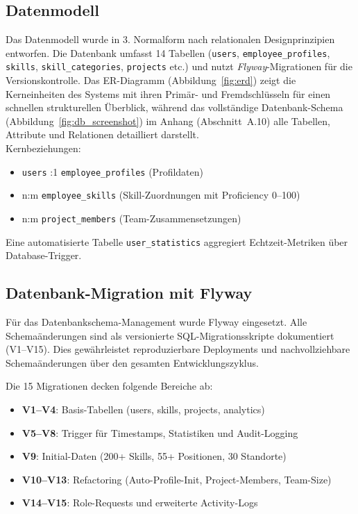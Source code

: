 \subsection{Datenmodell}

Das Datenmodell wurde in 3. Normalform nach relationalen Designprinzipien 
entworfen\cite{database_design}. Die Datenbank umfasst 14 Tabellen 
(\texttt{users}, \texttt{employee\_profiles}, \texttt{skills}, 
\newline\texttt{skill\_categories}, \texttt{projects} etc.) und nutzt 
\textit{Flyway}-Migrationen für die Versionskontrolle. Das ER-Diagramm (Abbildung~\ref{fig:erd}) zeigt die Kerneinheiten des Systems mit ihren Primär- und Fremdschlüsseln für einen schnellen strukturellen Überblick, während das vollständige Datenbank-Schema (Abbildung~\ref{fig:db_screenshot}) im Anhang (Abschnitt~A.10) alle Tabellen, Attribute und Relationen detailliert darstellt. \\

Kernbeziehungen:
\begin{itemize}[noitemsep, topsep=2pt]
    \item \texttt{users} :1\; \texttt{employee\_profiles} (Profildaten)
    \item n:m \texttt{employee\_skills} (Skill-Zuordnungen mit 
          Proficiency 0--100)
    \item n:m \texttt{project\_members} (Team-Zusammensetzungen)
\end{itemize}

Eine automatisierte Tabelle \texttt{user\_statistics} aggregiert 
Echtzeit-Metriken über \\ Database-Trigger.

\subsection{Datenbank-Migration mit Flyway}

Für das Datenbankschema-Management wurde Flyway\cite{flyway_docs} eingesetzt. Alle Schemaänderungen sind als versionierte SQL-Migrationsskripte dokumentiert (V1--V15). Dies gewährleistet reproduzierbare Deployments und nachvollziehbare Schemaänderungen über den gesamten Entwicklungszyklus.

Die 15 Migrationen decken folgende Bereiche ab:
\begin{itemize}[noitemsep]
    \item \textbf{V1--V4}: Basis-Tabellen (users, skills, projects, analytics)
    \item \textbf{V5--V8}: Trigger für Timestamps, Statistiken und Audit-Logging
    \item \textbf{V9}: Initial-Daten (200+ Skills, 55+ Positionen, 30 Standorte)
    \item \textbf{V10--V13}: Refactoring (Auto-Profile-Init, Project-Members, Team-Size)
    \item \textbf{V14--V15}: Role-Requests und erweiterte Activity-Logs
\end{itemize}

